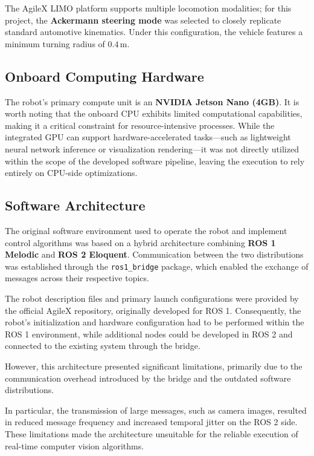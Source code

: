 \documentclass[a4paper,11pt,oneside]{book}
\begin{document}
The AgileX LIMO platform supports multiple locomotion modalities;
for this project, the \textbf{Ackermann steering mode} was selected
to closely replicate standard automotive kinematics.
Under this configuration, the vehicle features a minimum turning
radius of $0.4\,\mathrm{m}$.

\subsection{Onboard Computing Hardware}

The robot's primary compute unit is an \textbf{NVIDIA Jetson Nano (4GB)}.
It is worth noting that the onboard CPU exhibits limited computational
capabilities, making it a critical constraint for resource-intensive
processes. While the integrated GPU can support hardware-accelerated
tasks---such as lightweight neural network inference or visualization
rendering---it was not directly utilized within the scope of the
developed software pipeline, leaving the execution to rely entirely
on CPU-side optimizations.

\subsection{Software Architecture}

The original software environment used to operate the robot and
implement control algorithms was based on a hybrid architecture
combining \textbf{ROS 1 Melodic} and \textbf{ROS 2 Eloquent}.
Communication between the two distributions was established through
the \texttt{ros1\_bridge} package, which enabled the exchange of
messages across their respective topics.

The robot description files and primary launch configurations were
provided by the official AgileX repository, originally
developed for ROS 1. Consequently, the robot's initialization
and hardware configuration had to be performed within the ROS 1
environment, while additional nodes could be developed in ROS 2
and connected to the existing system through the bridge.

However, this architecture presented significant limitations,
primarily due to the communication overhead introduced by the bridge
and the outdated software distributions.

In particular, the transmission of large messages, such as camera
images, resulted in reduced message frequency and increased temporal
jitter on the ROS 2 side. These limitations made the architecture
unsuitable for the reliable execution of real-time computer vision
algorithms.
\end{document}

